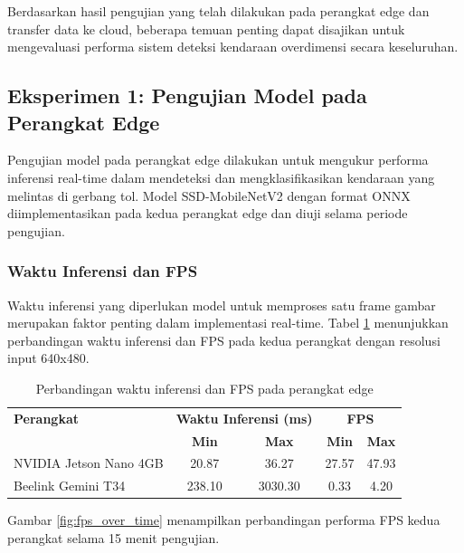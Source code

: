Berdasarkan hasil pengujian yang telah dilakukan pada perangkat edge dan transfer data ke cloud, beberapa temuan penting dapat disajikan untuk mengevaluasi performa sistem deteksi kendaraan overdimensi secara keseluruhan.

\subsection{Eksperimen 1: Pengujian Model pada Perangkat Edge}
\label{sec:eksperimen1}

Pengujian model pada perangkat edge dilakukan untuk mengukur performa inferensi real-time dalam mendeteksi dan mengklasifikasikan kendaraan yang melintas di gerbang tol. Model SSD-MobileNetV2 dengan format ONNX diimplementasikan pada kedua perangkat edge dan diuji selama periode pengujian.

\subsubsection{Waktu Inferensi dan FPS}

Waktu inferensi yang diperlukan model untuk memproses satu frame gambar merupakan faktor penting dalam implementasi real-time. Tabel \ref{tab:inference_time} menunjukkan perbandingan waktu inferensi dan FPS pada kedua perangkat dengan resolusi input 640x480.

\begin{table}[htbp]
  \centering
  \small
  \begin{tabular}{|l|c|c|c|c|}
  \hline
  \rowcolor[HTML]{C0C0C0}
  \textbf{Perangkat} & \multicolumn{2}{c|}{\textbf{Waktu Inferensi (ms)}} & \multicolumn{2}{c|}{\textbf{FPS}} \\
  \cline{2-5}
  \rowcolor[HTML]{C0C0C0}
  & \textbf{Min} & \textbf{Max} & \textbf{Min} & \textbf{Max} \\
  \hline
  NVIDIA Jetson Nano 4GB & 20.87 & 36.27 & 27.57 & 47.93 \\
  \hline
  Beelink Gemini T34 & 238.10 & 3030.30 & 0.33 & 4.20 \\
  \hline
  \end{tabular}
  \caption{Perbandingan waktu inferensi dan FPS pada perangkat edge}
  \label{tab:inference_time}
\end{table}

Gambar \ref{fig:fps_over_time} menampilkan perbandingan performa FPS kedua perangkat selama 15 menit pengujian. 

